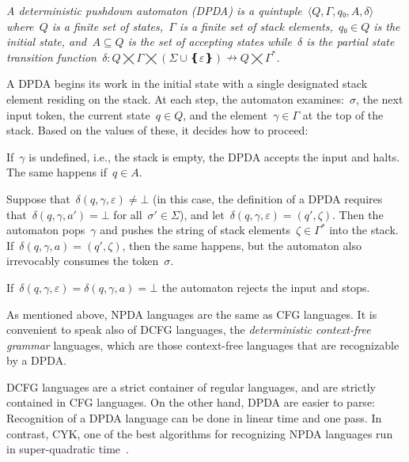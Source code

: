\begin{Definition}
  \label{Definition:DPDA}
  \slshape
  A \emph{deterministic pushdown automaton} (DPDA) is a quintuple~$⟨Q,Γ,q₀,A,δ⟩$
  where~$Q$ is a finite set of
    \emph{states},~$Γ$ is a finite
  \emph{set of stack elements},~$q₀∈Q$ is the initial state,
  and~$A⊆Q$ is the \emph{set of accepting states} while~$δ$ is
  the \emph{partial state transition function}~$δ:Q⨉Γ⨉(Σ∪❴ε❵)↛Q⨉Γ^*$.
  \par
  A DPDA begins its work in the initial state with a single designated stack element residing on the stack.
  At each step, the automaton examines:~$σ$, the next input token, the current state~$q∈Q$, and the element~$γ∈Γ$ at the top of the stack. Based on the values of these, it decides how to proceed:
  \par
  If~$γ$ is undefined, i.e., the stack is empty, the DPDA accepts the input and halts.
  The same happens if~$q∈A$.
  \par
  Suppose that~$δ(q,γ,ε)≠⊥$ (in this case, the definition of a DPDA requires that~$δ(q,γ,a')=⊥$ for all~$σ'∈Σ$),
  and let~$δ(q,γ,ε)=(q',ζ)$.
  Then the automaton pops~$γ$
  and pushes the string of stack elements~$ζ∈Γ^*$ into the stack.
  If~$δ(q,γ,a)=(q',ζ)$, then the same happens, but the
  automaton also irrevocably consumes the token~$σ$.
  \par
  If~$δ(q,γ,ε)=δ(q,γ,a)=⊥$ the automaton rejects the input and stops.
\end{Definition}

As mentioned above, NPDA languages are the same as CFG languages.
It is convenient to speak also of DCFG languages, the \emph{deterministic context-free grammar} languages,
which are those context-free languages that are recognizable by a DPDA.

DCFG languages are a strict container of regular languages,
  and are strictly contained in CFG languages.
On the other hand, DPDA are easier to parse:
  Recognition of a DPDA language
  can be done in linear time and one pass.
  In contrast, CYK, one of the best algorithms for recognizing NPDA languages run in super-quadratic time~\cite{Younger:1967,Cocke:1969,Earley:1970}.

